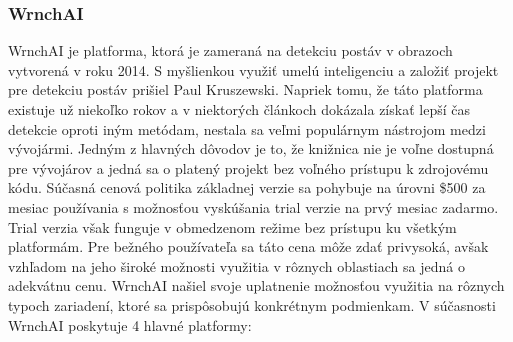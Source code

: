 \documentclass[slovak,master,dept460,male,cpp,cpdeclaration]{diploma}
\begin{document}
\subsubsection*{WrnchAI}
WrnchAI\cite{wrnchAI} je platforma, ktorá je zameraná na detekciu postáv v obrazoch vytvorená v roku 2014. S myšlienkou využiť umelú inteligenciu a založiť projekt pre detekciu postáv prišiel Paul Kruszewski. Napriek tomu, že táto platforma existuje už niekoľko rokov a v niektorých článkoch\cite{openposeVsWrnchAI} dokázala získať lepší čas detekcie oproti iným metódam,  nestala sa veľmi populárnym nástrojom medzi vývojármi. Jedným z hlavných dôvodov je to, že knižnica nie je voľne dostupná pre vývojárov a jedná sa o platený projekt bez voľného prístupu k zdrojovému kódu. Súčasná cenová politika základnej verzie sa pohybuje na úrovni \$500 za mesiac používania s možnosťou vyskúšania trial verzie na prvý mesiac zadarmo. Trial verzia však funguje v obmedzenom režime  bez prístupu ku všetkým platformám. Pre bežného používateľa sa táto cena môže zdať privysoká, avšak vzhľadom na jeho široké možnosti využitia  v rôznych oblastiach sa jedná o adekvátnu cenu. WrnchAI našiel svoje uplatnenie možnosťou využitia na rôznych typoch zariadení, ktoré sa prispôsobujú konkrétnym podmienkam. V súčasnosti WrnchAI poskytuje 4 hlavné platformy:
\end{document}
